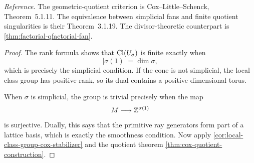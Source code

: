 \noindent
\textit{Reference.}
The geometric-quotient criterion is Cox--Little--Schenck,
Theorem~5.1.11. The equivalence between simplicial fans and finite
quotient singularities is their Theorem~3.1.19. The divisor-theoretic
counterpart is \cref{thm:factorial-qfactorial-fan}.

\begin{proof}
The rank formula shows that \(\operatorname{Cl}(U_\sigma)\) is finite exactly when
\[
|\sigma(1)|=\dim\sigma,
\]
which is precisely the simplicial condition. If the cone is not
simplicial, the local class group has positive rank, so its dual
contains a positive-dimensional torus.

When \(\sigma\) is simplicial, the group is trivial precisely when the
map
\[
M\longrightarrow\mathbb{Z}^{\sigma(1)}
\]
is surjective. Dually, this says that the primitive ray generators
form part of a lattice basis, which is exactly the smoothness
condition. Now apply
\cref{cor:local-class-group-cox-stabilizer} and the quotient theorem
\cref{thm:cox-quotient-construction}.
\end{proof}

